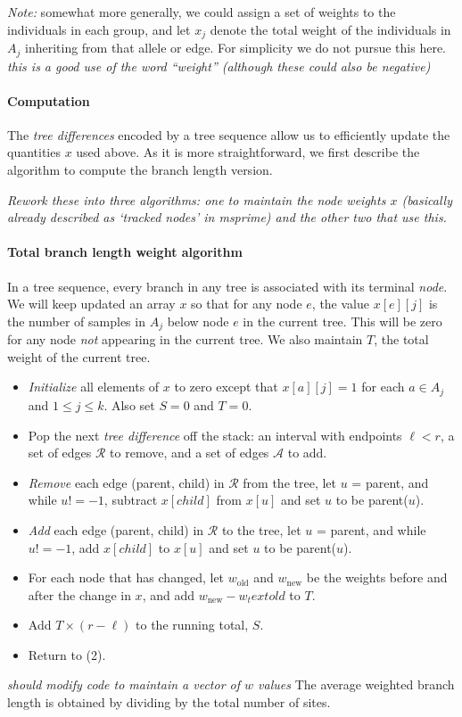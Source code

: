 \documentclass{article}
\newcommand{\plr}[1]{{\color{blue} \it #1}}
\begin{document}
\emph{Note:} somewhat more generally,
we could assign a set of weights to the individuals in each group,
and let $x_j$ denote the total weight of the individuals in $A_j$ 
inheriting from that allele or edge.
For simplicity we do not pursue this here.
\plr{this is a good use of the word ``weight'' (although these could also be negative)}


\paragraph{Computation}
The \emph{tree differences} encoded by a tree sequence allow us to efficiently update the quantities $x$ used above.
As it is more straightforward, we first describe the algorithm
to compute the branch length version.

\plr{Rework these into three algorithms: one to maintain the node weights $x$ 
    (basically already described as `tracked nodes' in msprime)
    and the other two that use this.}

\paragraph{Total branch length weight algorithm}
In a tree sequence, every branch in any tree is associated with its terminal \emph{node}.
We will keep updated an array $x$ so that for any node $e$,
the value $x[e][j]$ is the number of samples in $A_j$ below node $e$ in the current tree.
This will be zero for any node \emph{not} appearing in the current tree.
We also maintain $T$, the total weight of the current tree.
\begin{itemize}
    \item \emph{Initialize} all elements of $x$ to zero
        except that $x[a][j] = 1$ for each $a \in A_j$ and $1 \le j \le k$.
        Also set $S=0$ and $T=0$.
    \item Pop the next \emph{tree difference} off the stack: an interval with endpoints $\ell < r$,
        a set of edges $\mathcal{R}$ to remove, and a set of edges $\mathcal{A}$ to add.
    \item \emph{Remove} each edge (parent, child) in $\mathcal{R}$ from the tree,
        let $u$ = parent, and while $u != -1$,
        subtract $x[child]$ from $x[u]$ and set $u$ to be parent($u$).
    \item \emph{Add} each edge (parent, child) in $\mathcal{R}$ to the tree,
        let $u$ = parent, and while $u != -1$,
        add $x[child]$ to $x[u]$ and set $u$ to be parent($u$).
    \item For each node that has changed, let $w_\text{old}$ and $w_\text{new}$
        be the weights before and after the change in $x$,
        and add $w_\text{new} - w_text{old}$ to $T$.
    \item Add $T \times (r-\ell)$ to the running total, $S$.
    \item Return to (2).
\end{itemize}
\plr{should modify code to maintain a vector of $w$ values}
The average weighted branch length is obtained by dividing by the total number of sites.
\end{document}

